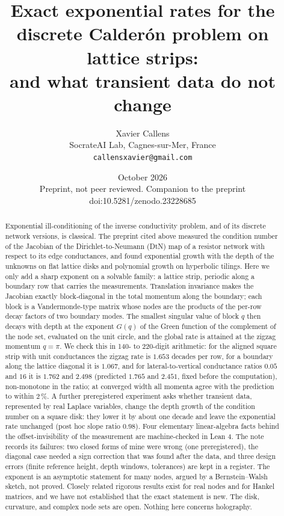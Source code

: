 \documentclass[11pt,a4paper]{article}
\title{Exact exponential rates for the discrete Calder\'on problem on lattice strips:\\ and what transient data do not change}
\author{Xavier Callens\\[2pt]
\small SocrateAI Lab, Cagnes-sur-Mer, France\\
\small \texttt{callensxavier@gmail.com}}
\date{October 2026 \\ \small Preprint, not peer reviewed. Companion to the preprint doi:10.5281/zenodo.23228685}
\begin{document}
\maketitle

\begin{abstract}
Exponential ill-conditioning of the inverse conductivity problem, and of its discrete network versions, is classical. The
preprint cited above measured the condition number of the Jacobian of the Dirichlet-to-Neumann (DtN) map of a resistor network
with respect to its edge conductances, and found exponential growth with the depth of the unknowns on flat lattice disks and
polynomial growth on hyperbolic tilings. Here we only add a sharp exponent on a solvable family:
a lattice strip, periodic along a boundary row that carries the measurements. Translation invariance makes the Jacobian
exactly block-diagonal in the total momentum along the boundary; each block is a Vandermonde-type matrix whose nodes are the
products of the per-row decay factors of two boundary modes. The smallest singular value of block $q$ then decays with depth
at the exponent $G(q)$ of the Green function of the complement of the node set, evaluated on the unit circle, and the global
rate is attained at the zigzag momentum $q=\pi$. We check this in 140- to 220-digit arithmetic: for the aligned square strip
with unit conductances the zigzag rate is $1.653$ decades per row, for a boundary along the lattice diagonal it is $1.067$,
and for lateral-to-vertical conductance ratios $0.05$ and $16$ it is $1.762$ and $2.498$ (predicted $1.765$ and $2.451$,
fixed before the computation), non-monotone in the ratio; at converged width all momenta agree with the prediction to within
$2\,\%$. A further preregistered experiment asks whether transient data, represented by real Laplace variables, change the depth growth of the condition number on a square disk: they lower it by about one decade and leave the exponential rate unchanged (post hoc slope ratio $0.98$). Four elementary linear-algebra facts behind the offset-invisibility of the measurement are machine-checked in Lean 4. The note records its failures: two closed forms of mine were wrong (one preregistered), the diagonal case needed a
sign correction that was found after the data, and three design errors (finite reference height, depth windows, tolerances)
are kept in a register. The exponent is an asymptotic statement for many nodes, argued by a Bernstein--Walsh sketch, not proved. Closely related rigorous
results exist for real nodes and for Hankel matrices, and we have not established that the exact statement is new. The disk,
curvature, and complex node sets are open. Nothing here concerns holography.
\end{abstract}
\end{document}
